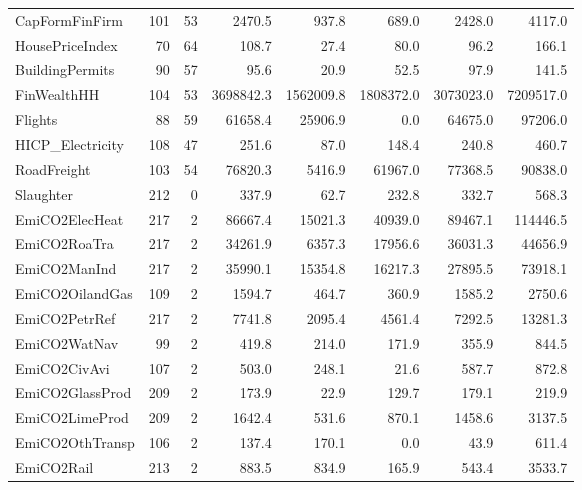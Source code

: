 {\begin{tabular}[t]{lrrrrrrr}
CapFormFinFirm & 101 & 53 & \num{2470.5} & \num{937.8} & \num{689.0} & \num{2428.0} & \num{4117.0}\\
HousePriceIndex & 70 & 64 & \num{108.7} & \num{27.4} & \num{80.0} & \num{96.2} & \num{166.1}\\
BuildingPermits & 90 & 57 & \num{95.6} & \num{20.9} & \num{52.5} & \num{97.9} & \num{141.5}\\
FinWealthHH & 104 & 53 & \num{3698842.3} & \num{1562009.8} & \num{1808372.0} & \num{3073023.0} & \num{7209517.0}\\
Flights & 88 & 59 & \num{61658.4} & \num{25906.9} & \num{0.0} & \num{64675.0} & \num{97206.0}\\
HICP\_Electricity & 108 & 47 & \num{251.6} & \num{87.0} & \num{148.4} & \num{240.8} & \num{460.7}\\
RoadFreight & 103 & 54 & \num{76820.3} & \num{5416.9} & \num{61967.0} & \num{77368.5} & \num{90838.0}\\
Slaughter & 212 & 0 & \num{337.9} & \num{62.7} & \num{232.8} & \num{332.7} & \num{568.3}\\
EmiCO2ElecHeat & 217 & 2 & \num{86667.4} & \num{15021.3} & \num{40939.0} & \num{89467.1} & \num{114446.5}\\
EmiCO2RoaTra & 217 & 2 & \num{34261.9} & \num{6357.3} & \num{17956.6} & \num{36031.3} & \num{44656.9}\\
EmiCO2ManInd & 217 & 2 & \num{35990.1} & \num{15354.8} & \num{16217.3} & \num{27895.5} & \num{73918.1}\\
EmiCO2OilandGas & 109 & 2 & \num{1594.7} & \num{464.7} & \num{360.9} & \num{1585.2} & \num{2750.6}\\
EmiCO2PetrRef & 217 & 2 & \num{7741.8} & \num{2095.4} & \num{4561.4} & \num{7292.5} & \num{13281.3}\\
EmiCO2WatNav & 99 & 2 & \num{419.8} & \num{214.0} & \num{171.9} & \num{355.9} & \num{844.5}\\
EmiCO2CivAvi & 107 & 2 & \num{503.0} & \num{248.1} & \num{21.6} & \num{587.7} & \num{872.8}\\
EmiCO2GlassProd & 209 & 2 & \num{173.9} & \num{22.9} & \num{129.7} & \num{179.1} & \num{219.9}\\
EmiCO2LimeProd & 209 & 2 & \num{1642.4} & \num{531.6} & \num{870.1} & \num{1458.6} & \num{3137.5}\\
EmiCO2OthTransp & 106 & 2 & \num{137.4} & \num{170.1} & \num{0.0} & \num{43.9} & \num{611.4}\\
EmiCO2Rail & 213 & 2 & \num{883.5} & \num{834.9} & \num{165.9} & \num{543.4} & \num{3533.7}\\

\end{tabular}}

